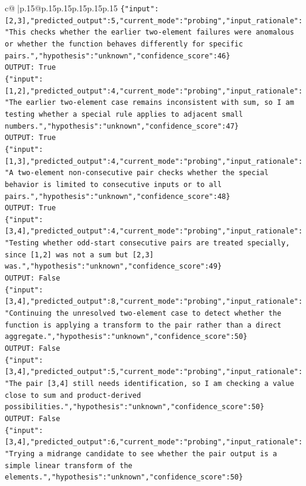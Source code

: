 \documentclass{article}
\begin{document}
{\begin{supertabular}{c@{$\;$}|p{.15\linewidth}@{}p{.15\linewidth}p{.15\linewidth}p{.15\linewidth}p{.15\linewidth}p{.15\linewidth}}
{{{\texttt{\{"input":{[}2,3{]},"predicted\_output":5,"current\_mode":"probing","input\_rationale":"This checks whether the earlier two{-}element failures were anomalous or whether the function behaves differently for specific pairs.","hypothesis":"unknown","confidence\_score":46\}} \\
\texttt{OUTPUT: True} \\
\texttt{\{"input":{[}1,2{]},"predicted\_output":4,"current\_mode":"probing","input\_rationale":"The earlier two{-}element case remains inconsistent with sum, so I am testing whether a special rule applies to adjacent small numbers.","hypothesis":"unknown","confidence\_score":47\}} \\
\texttt{OUTPUT: True} \\
\texttt{\{"input":{[}1,3{]},"predicted\_output":4,"current\_mode":"probing","input\_rationale":"A two{-}element non{-}consecutive pair checks whether the special behavior is limited to consecutive inputs or to all pairs.","hypothesis":"unknown","confidence\_score":48\}} \\
\texttt{OUTPUT: True} \\
\texttt{\{"input":{[}3,4{]},"predicted\_output":4,"current\_mode":"probing","input\_rationale":"Testing whether odd{-}start consecutive pairs are treated specially, since {[}1,2{]} was not a sum but {[}2,3{]} was.","hypothesis":"unknown","confidence\_score":49\}} \\
\texttt{OUTPUT: False} \\
\texttt{\{"input":{[}3,4{]},"predicted\_output":8,"current\_mode":"probing","input\_rationale":"Continuing the unresolved two{-}element case to detect whether the function is applying a transform to the pair rather than a direct aggregate.","hypothesis":"unknown","confidence\_score":50\}} \\
\texttt{OUTPUT: False} \\
\texttt{\{"input":{[}3,4{]},"predicted\_output":5,"current\_mode":"probing","input\_rationale":"The pair {[}3,4{]} still needs identification, so I am checking a value close to sum and product{-}derived possibilities.","hypothesis":"unknown","confidence\_score":50\}} \\
\texttt{OUTPUT: False} \\
\texttt{\{"input":{[}3,4{]},"predicted\_output":6,"current\_mode":"probing","input\_rationale":"Trying a midrange candidate to see whether the pair output is a simple linear transform of the elements.","hypothesis":"unknown","confidence\_score":50\}} \\
}}}
\end{supertabular}}
\end{document}
